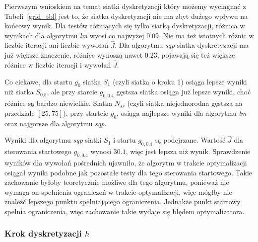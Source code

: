 \documentclass[11pt]{article}
\begin{document}
Pierwszym wnioskiem na temat siatki dyskretyzacji który możemy wyciągnąć z Tabeli~\ref{grid_tbl} jest to, że siatka dyskretyzacji nie ma zbyt dużego wpływu na końcowy wynik. Dla testów różniących się tylko siatką dyskretyzacji, różnica w wynikach dla algorytmu {\it lm\/} wyosi co najwyżej $0.09$. Nie ma też istotnych różnic w liczbie iteracji ani liczbie wywołań $\hat{J}$. Dla algorytmu {\it sqp\/} siatka dyskretyzacji ma już większe znaczenie, różnice wynoszą nawet $0.23$, pojawają się też większe różnice w liczbie iteracji i wywołań $\hat{J}$.

Co ciekawe, dla startu $g_0$ siatka $S_1$ (czyli siatka o kroku 1) osiąga lepsze wyniki niż siatka $S_{0.5}$, ale przy starcie $g_{0,0.4}$ gęstsza siatka osiąga już lepsze wyniki, choć różnice są bardzo niewielkie. Siatka $N_{sr}$ (czyli siatka niejednorodna gęstsza na przedziale $[25, 75]$), przy startcie $g_0$, osiąga najlepsze wyniki  dla algorytmu {\it lm\/} oraz najgorsze dla algorytmu {\it sqp}.

Wyniki dla algorytmu {\it sqp\/} siatki $S_1$ i startu $g_{0,0.4}$ są podejrzane. Wartość $\hat{J}$ dla sterowania startowego $g_{0,0.4}$ wynosi $30.1$, więc jest lepsza niż wynik. Sprawdzenie wyników dla wywołań pośrednich ujawniło, że algorytm w trakcie optymalizacji osiągał wyniki podobne jak pozostałe testy dla tego sterowania startowego. Takie zachowanie byłoby teoretycznie możliwe dla tego algorytmu, ponieważ nie wymaga on spełnienia ograniczeń w trakcie optymalizacji, więc mógłby nie znaleźć lepszego punktu spełniającego ograniczenia. Jednakże punkt startowy spełnia ograniczenia, więc zachowanie takie wydaje się błędem optymalizatora.

\subsubsection{Krok dyskretyzacji $h$}
\end{document}
